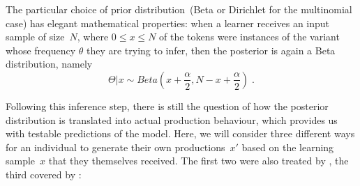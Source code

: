 The particular choice of prior distribution~(Beta or Dirichlet for the multinomial case) has elegant mathematical properties: when a learner receives an input sample of size~$N$, where $0\le x \le N$ of the tokens were instances of the variant whose frequency $\theta$ they are trying to infer, then the posterior is again a Beta distribution, namely
\begin{equation}
\label{eq:posterior}
\Theta|x \sim Beta(x+\frac{\alpha}{2}, N-x+\frac{\alpha}{2})\;. %
\end{equation}

Following this inference step, there is still the question of how the posterior distribution is translated into actual production behaviour, which provides us with testable predictions of the model. %
Here, we will consider three different ways for an individual to generate their own productions~$x'$ based on the learning sample~$x$ that they themselves received. %
The first two were also treated by \citet{Reali2009}, the third covered by \citet[p.156]{Ferdinand2015}:

